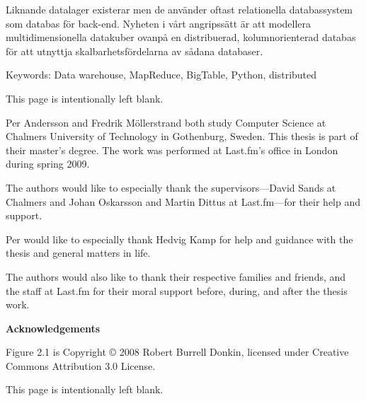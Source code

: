 Liknande datalager existerar men de anv{\"a}nder oftast relationella
databassystem som databas f{\"o}r back-end. Nyheten i v{\aa}rt angripss{\"a}tt
{\"a}r att modellera multidimensionella datakuber ovanp{\aa} en distribuerad,
kolumnorienterad databas f{\"o}r att utnyttja skalbarhetsf{\"o}rdelarna av
s{\aa}dana databaser.

\vfill

Keywords: Data warehouse, MapReduce, BigTable, Python, distributed


\pagebreak
This page is intentionally left blank.
\pagebreak


\vspace{12pt}

\noindent Per Andersson and Fredrik M{\"o}llerstrand both study Computer
Science at Chalmers University of Technology in Gothenburg, Sweden. This thesis
is part of their master's degree. The work was performed at Last.fm's
office in London during spring 2009.

The authors would like to especially thank the supervisors---David Sands at
Chalmers and Johan Oskarsson and Martin Dittus at Last.fm---for their help and
support.

Per would like to especially thank Hedvig Kamp for help and guidance with the
thesis and general matters in life.

The authors would also like to thank their respective families and friends, and
the staff at Last.fm for their moral support before, during, and after the
thesis work.

\vspace{24pt}

\noindent \textbf{Acknowledgements}
\vspace{12pt}

\noindent Figure 2.1 is Copyright {\copyright} 2008 Robert Burrell Donkin,
licensed under Creative Commons Attribution 3.0 License.


\pagebreak
This page is intentionally left blank.
\pagebreak

\tableofcontents
\vfill

\pagebreak

\begin{minipage}{116mm}
    \listoffigures
\end{minipage}

\begin{minipage}{116mm}
    \listoftables
\end{minipage}

